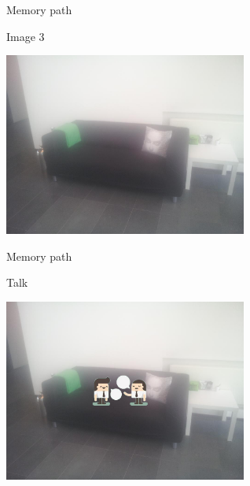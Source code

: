 \begin{frame}{Memory path}
  \begin{block}{Image 3}
    \begin{center}
      \includegraphics[height=6cm]{img/loci/03.jpg}
    \end{center}
  \end{block}
\end{frame}
\begin{frame}{Memory path}
  \begin{block}{Talk}
    \begin{center}
      \includegraphics[height=6cm]{img/loci/03-talk.jpg}
    \end{center}
  \end{block}
\end{frame}

